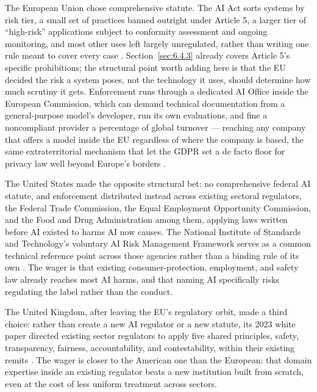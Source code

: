 The European Union chose comprehensive statute. The AI Act sorts systems by risk tier, a small set of practices banned outright under Article 5, a larger tier of “high-risk” applications subject to conformity assessment and ongoing monitoring, and most other uses left largely unregulated, rather than writing one rule meant to cover every case \autocite{eu2024aiact}. Section~\ref{sec:6.4.3} already covers Article 5's specific prohibitions; the structural point worth adding here is that the EU decided the risk a system poses, not the technology it uses, should determine how much scrutiny it gets. Enforcement runs through a dedicated AI Office inside the European Commission, which can demand technical documentation from a general-purpose model's developer, run its own evaluations, and fine a noncompliant provider a percentage of global turnover — reaching any company that offers a model inside the EU regardless of where the company is based, the same extraterritorial mechanism that let the GDPR set a de facto floor for privacy law well beyond Europe's borders \autocite{eu2024aiactenforcement}.

The United States made the opposite structural bet: no comprehensive federal AI statute, and enforcement distributed instead across existing sectoral regulators, the Federal Trade Commission, the Equal Employment Opportunity Commission, and the Food and Drug Administration among them, applying laws written before AI existed to harms AI now causes. The National Institute of Standards and Technology's voluntary AI Risk Management Framework serves as a common technical reference point across those agencies rather than a binding rule of its own \autocite{nist2023airmf}. The wager is that existing consumer-protection, employment, and safety law already reaches most AI harms, and that naming AI specifically risks regulating the label rather than the conduct.

The United Kingdom, after leaving the EU's regulatory orbit, made a third choice: rather than create a new AI regulator or a new statute, its 2023 white paper directed existing sector regulators to apply five shared principles, safety, transparency, fairness, accountability, and contestability, within their existing remits \autocite{dsit2023proinnovation}. The wager is closer to the American one than the European: that domain expertise inside an existing regulator beats a new institution built from scratch, even at the cost of less uniform treatment across sectors.

